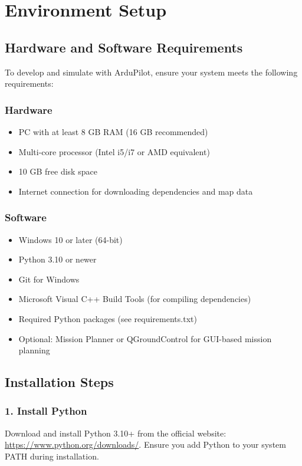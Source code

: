 \documentclass[12pt,a4paper]{report}
\begin{document}

\chapter{Environment Setup}

\section{Hardware and Software Requirements}
To develop and simulate with ArduPilot, ensure your system meets the following requirements:

\subsection*{Hardware}
\begin{itemize}
    \item PC with at least 8 GB RAM (16 GB recommended)
    \item Multi-core processor (Intel i5/i7 or AMD equivalent)
    \item 10 GB free disk space
    \item Internet connection for downloading dependencies and map data
\end{itemize}

\subsection*{Software}
\begin{itemize}
    \item Windows 10 or later (64-bit)
    \item Python 3.10 or newer
    \item Git for Windows
    \item Microsoft Visual C++ Build Tools (for compiling dependencies)
    \item Required Python packages (see requirements.txt)
    \item Optional: Mission Planner or QGroundControl for GUI-based mission planning
\end{itemize}

\section{Installation Steps}
\subsection*{1. Install Python}
Download and install Python 3.10+ from the official website: \url{https://www.python.org/downloads/}. Ensure you add Python to your system PATH during installation.
\end{document}
